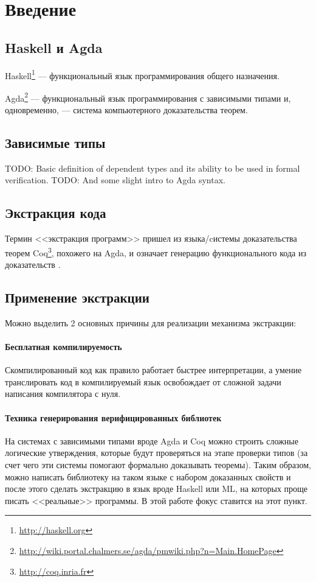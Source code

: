 \section{Введение}

\subsection{Haskell и Agda}

Haskell\footnote{\url{http://haskell.org}} --- функциональный язык программирования
общего назначения.

Agda\footnote{\url{http://wiki.portal.chalmers.se/agda/pmwiki.php?n=Main.HomePage}} ---
функциональный язык программирования с зависимыми типами и, одновременно, ---
система компьютерного доказательства теорем.

\subsection{Зависимые типы}

TODO: Basic definition of dependent types and its ability to be used in formal verification.
TODO: And some slight intro to Agda syntax.

\subsection{Экстракция кода}\label{sec:intro-extraction}

Термин <<экстракция программ>> пришел из языка/cистемы доказательства теорем
Coq\footnote{\url{http://coq.inria.fr}}, похожего на Agda, и означает генерацию
функционального кода из доказательств \cite{Let02}.

\subsection{Применение экстракции}

Можно выделить 2 основных причины для реализации механизма экстракции:

\paragraph{Бесплатная компилируемость}

Скомпилированный код как правило работает быстрее интерпретации, а умение
транслировать код в компилируемый язык освобождает от сложной задачи
написания компилятора с нуля.

\paragraph{Техника генерирования верифицированных библиотек}

На системах с зависимыми типами вроде Agda и Coq можно строить
сложные логические утверждения, которые будут проверяться на этапе
проверки типов (за счет чего эти системы помогают формально доказывать теоремы).
Таким образом, можно написать библиотеку на таком языке с набором доказанных
свойств и после этого сделать экстракцию в язык вроде Haskell или ML,
на которых проще писать <<реальные>> программы. В этой работе фокус ставится на этот пункт.
